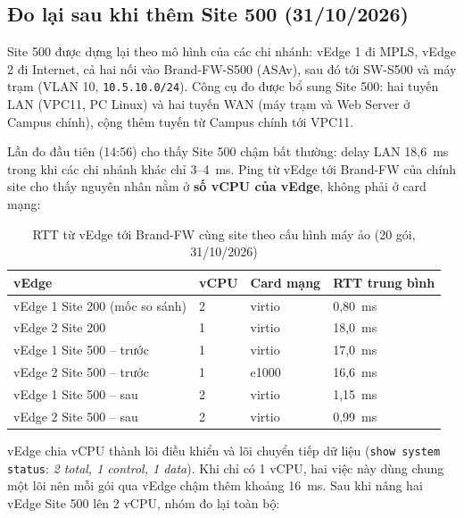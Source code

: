 \subsection{Đo lại sau khi thêm Site 500 (31/10/2026)}

Site 500 được dựng lại theo mô hình của các chi nhánh: vEdge 1 đi MPLS, vEdge 2 đi Internet, cả hai nối vào Brand-FW-S500 (ASAv), sau đó tới SW-S500 và máy trạm (VLAN 10, \texttt{10.5.10.0/24}). Công cụ đo được bổ sung Site 500: hai tuyến LAN (VPC11, PC Linux) và hai tuyến WAN (máy trạm và Web Server ở Campus chính), cộng thêm tuyến từ Campus chính tới VPC11.

Lần đo đầu tiên (14:56) cho thấy Site 500 chậm bất thường: delay LAN 18,6~ms trong khi các chi nhánh khác chỉ 3--4~ms. Ping từ vEdge tới Brand-FW của chính site cho thấy nguyên nhân nằm ở \textbf{số vCPU của vEdge}, không phải ở card mạng:

\begin{table}[H]
    \centering
    \small
    \caption{RTT từ vEdge tới Brand-FW cùng site theo cấu hình máy ảo (20 gói, 31/10/2026)}
    \label{tab:vcpu}
    \begin{tabularx}{\textwidth}{|X|P{1.6cm}|P{2.6cm}|P{2.6cm}|}
        \hline
        \textbf{vEdge} & \textbf{vCPU} & \textbf{Card mạng} & \textbf{RTT trung bình} \\
        \hline
        vEdge 1 Site 200 (mốc so sánh) & 2 & virtio & 0,80~ms \\
        \hline
        vEdge 2 Site 200 & 1 & virtio & 18,0~ms \\
        \hline
        vEdge 1 Site 500 -- trước & 1 & virtio & 17,0~ms \\
        \hline
        vEdge 2 Site 500 -- trước & 1 & e1000 & 16,6~ms \\
        \hline
        vEdge 1 Site 500 -- sau & 2 & virtio & 1,15~ms \\
        \hline
        vEdge 2 Site 500 -- sau & 2 & virtio & 0,99~ms \\
        \hline
    \end{tabularx}
\end{table}

vEdge chia vCPU thành lõi điều khiển và lõi chuyển tiếp dữ liệu (\texttt{show system status}: \textit{2 total, 1 control, 1 data}). Khi chỉ có 1 vCPU, hai việc này dùng chung một lõi nên mỗi gói qua vEdge chậm thêm khoảng 16~ms. Sau khi nâng hai vEdge Site 500 lên 2 vCPU, nhóm đo lại toàn bộ:


